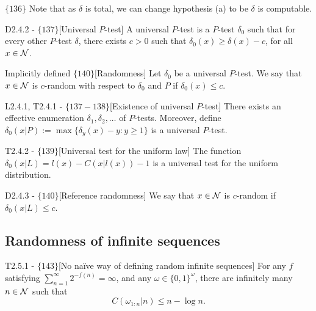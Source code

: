 \documentclass{article}
\begin{document}
$\{136\}$ Note that as $\delta$ is total, we can change hypothesis (a) to be $\delta$ is computable.

\begin{flexidefinition}{D2.4.2 - $\{137\}$}[Universal $P$-test]
    A universal $P$-test is a $P$-test $\delta_0$ such that for every other $P$-test $\delta$, there exists $c > 0$ such that $\delta_0(x) \geq \delta(x) - c$, for all $x \in \mathcal{N}$.
\end{flexidefinition}

\begin{flexidefinition}{Implicitly defined $\{140\}$}[Randomness]
    Let $\delta_0$ be a universal $P$-test. We say that $x\in \mathcal{N}$ is $c$-random with respect to $\delta_0$ and $P$ if $\delta_0(x) \leq c$.
    
\end{flexidefinition}

\begin{flexitheorem}{L2.4.1, T2.4.1 - $\{137-138\}$}[Existence of universal $P$-test]
    There exists an effective enumeration $\delta_1, \delta_2, \ldots$ of $P$-tests. Moreover, define $\delta_0(x|P) := \max \{\delta_y(x) - y : y \geq 1 \}$ is a universal $P$-test.
\end{flexitheorem}

\begin{flexitheorem}{T2.4.2 - $\{139\}$}[Universal test for the uniform law]
    The function $\delta_0(x|L) = l(x) - C(x|l(x)) -1$ is a universal test for the uniform distribution.
\end{flexitheorem}

\begin{flexidefinition}{D2.4.3 - $\{140\}$}[Reference randomness]
    We say that $x \in \mathcal{N}$ is $c$-random if $\delta_0(x|L) \leq c$.
\end{flexidefinition}


\subsection{Randomness of infinite sequences}

\begin{flexitheorem}{T2.5.1 - $\{143\}$}[No naïve way of defining random infinite sequences]
    For any $f$ satisfying $\sum_{n=1}^\infty 2^{-f(n)} = \infty$, and any $\omega \in \{0,1\}^\omega$, there are infinitely many $n \in \mathcal{N}$ such that 
    \begin{equation}
        C(\omega_{1:n}|n) \leq n - \log n.
    \end{equation}
\end{flexitheorem}
\end{document}
